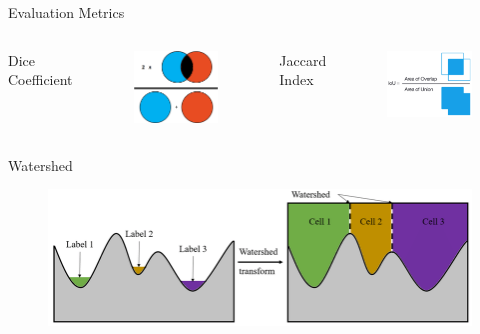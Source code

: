 \begin{frame}{Evaluation Metrics}
    \begin{columns}
        Dice Coefficient
        \begin{figure}[!htb]
            \centering
            \includegraphics[width=5cm]{figures/method/dice_coefficient}
        \end{figure}
        Jaccard Index
        \begin{figure}[!htb]
            \centering
            \includegraphics[width=5cm]{figures/method/jaccard_index}
        \end{figure}
    \end{columns}
\end{frame}


\begin{frame}{Watershed}
    \begin{figure}
        \centering
        \includegraphics[width=15cm\textwidth]{figures/method/watershed}
    \end{figure}
\end{frame}

